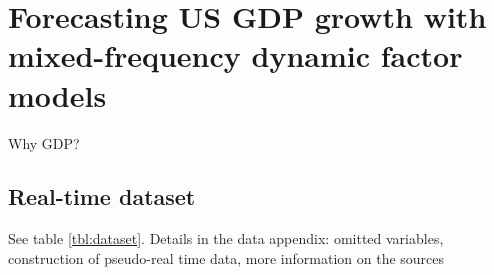 \chapter{Forecasting US GDP growth with mixed-frequency dynamic factor models}

Why GDP?

\section{Real-time dataset}

See table \ref{tbl:dataset}. Details in the data appendix: omitted variables, construction of pseudo-real time data, more information on the sources






